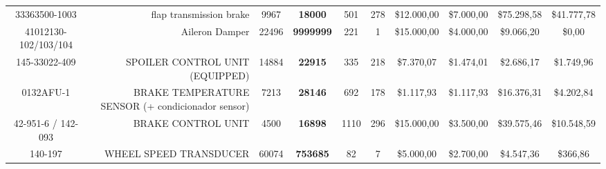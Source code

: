 \begin{table}[htbp]
\begin{tabular}{rrrrrrrrcc}
    \multicolumn{1}{c}{33363500-1003} & flap transmission brake & \multicolumn{1}{c}{9967} & \multicolumn{1}{c}{\textbf{18000}} & \multicolumn{1}{c}{501} & \multicolumn{1}{c}{278} & \multicolumn{1}{c}{\$12.000,00} & \multicolumn{1}{c}{\$7.000,00} & \$75.298,58 & \$41.777,78 \\
    \multicolumn{1}{c}{41012130-102/103/104} & Aileron Damper & \multicolumn{1}{c}{22496} & \multicolumn{1}{c}{\textbf{9999999}} & \multicolumn{1}{c}{221} & \multicolumn{1}{c}{1} & \multicolumn{1}{c}{\$15.000,00} & \multicolumn{1}{c}{\$4.000,00} & \$9.066,20 & \$0,00 \\
    \multicolumn{1}{c}{145-33022-409} & SPOILER CONTROL UNIT (EQUIPPED) & \multicolumn{1}{c}{14884} & \multicolumn{1}{c}{\textbf{22915}} & \multicolumn{1}{c}{335} & \multicolumn{1}{c}{218} & \multicolumn{1}{c}{\$7.370,07} & \multicolumn{1}{c}{\$1.474,01} & \$2.686,17 & \$1.749,96 \\
    \multicolumn{1}{c}{0132AFU-1} & BRAKE TEMPERATURE SENSOR (+ condicionador sensor) & \multicolumn{1}{c}{7213} & \multicolumn{1}{c}{\textbf{28146}} & \multicolumn{1}{c}{692} & \multicolumn{1}{c}{178} & \multicolumn{1}{c}{\$1.117,93} & \multicolumn{1}{c}{\$1.117,93} & \$16.376,31 & \$4.202,84 \\
    \multicolumn{1}{c}{42-951-6 / 142-093} & BRAKE CONTROL UNIT & \multicolumn{1}{c}{4500} & \multicolumn{1}{c}{\textbf{16898}} & \multicolumn{1}{c}{1110} & \multicolumn{1}{c}{296} & \multicolumn{1}{c}{\$15.000,00} & \multicolumn{1}{c}{\$3.500,00} & \$39.575,46 & \$10.548,59 \\
    \multicolumn{1}{c}{140-197} & WHEEL SPEED TRANSDUCER  & \multicolumn{1}{c}{60074} & \multicolumn{1}{c}{\textbf{753685}} & \multicolumn{1}{c}{82} & \multicolumn{1}{c}{7} & \multicolumn{1}{c}{\$5.000,00} & \multicolumn{1}{c}{\$2.700,00} & \$4.547,36 & \$366,86 \\
    \bottomrule
    \end{tabular}%
  \label{tab:costs1}%
\end{table}%

